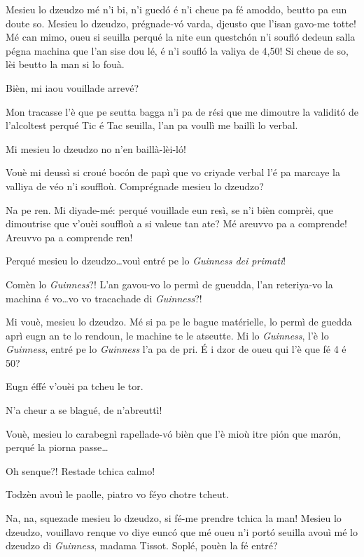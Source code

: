 \begin{drama}
\Cienspeaks Mesieu lo dzeudzo mé n’i bi, n’i guedó é n’i cheue pa fé amoddo, beutto pa eun doute so. Mesieu lo dzeudzo, prégnade-v\'o varda, djeusto que l'isan gavo-me totte! Mé can mimo, oueu si seuilla perqué la nite eun questchón n’i soufló dedeun salla pégna machina que l’an sise dou lé, é n’i soufló la valiya de 4,50! Si cheue de so, lèi beutto la man si lo fouà.

\DzeudzoSenliquerspeaks Bièn, mi iaou vouillade arrevé?

\Cienspeaks Mon tracasse l’è que pe seutta bagga n’i pa de rési que me dimoutre la validitó de l'alcoltest perqué Tic é Tac seuilla, l’an pa voullì me baillì lo verbal.

\Ticspeaks Mi mesieu lo dzeudzo no n’en baillà-lèi-l\'o!

\Cienspeaks Vouè mi deussì si croué bocón de papì que vo criyade verbal l'é pa marcaye la valliya de véo n’i souffloù. Comprégnade mesieu lo dzeudzo?

\DzeudzoSenliquerspeaks Na pe ren. Mi diyade-mé: perqué vouillade eun resì, se n’i bièn comprèi, que dimoutrise que v'ouèi souffloù a si valeue tan ate? Mé areuvvo pa a comprende! Areuvvo pa a comprende ren!

\Cienspeaks Perqué mesieu lo dzeudzo\ldots vouì entré pe lo  \textit{Guinness dei primati}!

\DzeudzoSenliquerspeaks Comèn lo \textit{Guinness}?!  L'an gavou-vo lo permì de gueudda, l'an reteriya-vo la machina é vo\ldots vo vo tracachade di \textit{Guinness}?!

\Cienspeaks Mi vouè, mesieu lo dzeudzo. Mé si pa pe le bague matérielle, lo permì de guedda aprì eugn an te lo rendoun, le machine te le atseutte. Mi lo \textit{Guinness}, l'è lo \textit{Guinness}, entré pe lo \textit{Guinness} l'a pa de pri. É i dzor de oueu qui l'è que fé 4 é 50?

\DzeudzoSenliquerspeaks Eugn éffé v'ouèi pa tcheu le tor.

\Ticspeaks N'a cheur a se blagué, de n’abreuttì!

\Cienspeaks Vouè, mesieu lo carabegnì rapellade-v\'o bièn que l'è mioù itre pi\'on que marón, perqué la piorna passe\ldots

\Ticspeaks {} Oh senque?! Restade tchica calmo!

\DzeudzoSenliquerspeaks {} Todzèn avouì le paolle, piatro vo féyo chotre tcheut.

\Cienspeaks Na, na, squezade mesieu lo dzeudzo, si fé-me prendre tchica la man! Mesieu lo dzeudzo, vouillavo renque vo diye eunc\'o que mé oueu n’i portó seuilla avouì mé lo dzeudzo di \textit{Guinness}, madama Tissot. Soplé, pouèn la fé entré?


\end{drama}
